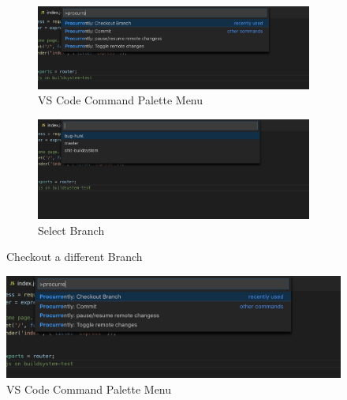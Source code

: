 \begin{figure}[h]
    \begin{subfigure}{.5\textwidth}
        \centering
        \includegraphics[width=1\linewidth]{figures/screenshots/scenarios/1checkout_branch.png}
        \caption{VS Code Command Palette Menu}
        \label{fig:1checkout_branch_palette}
    \end{subfigure}
    \begin{subfigure}{.5\textwidth}
        \centering
        \includegraphics[width=1\linewidth]{figures/screenshots/scenarios/1checkout_bughunt.png}
        \caption{Select Branch}
        \label{fig:1checkout_bughunt}
    \end{subfigure}
    \caption{Checkout a different Branch}
\end{figure}

\begin{figure}[h]
        \centering
        \includegraphics[width=1\linewidth]{figures/screenshots/scenarios/1checkout_branch.png}
        \caption{VS Code Command Palette Menu}
        \label{fig:1checkout_branch_palette}
    
\end{figure}

